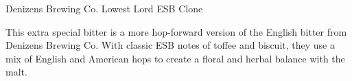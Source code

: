 \stylesection{\stylestrongbitter}

\begin{recipe}{Denizens Brewing Co. Lowest Lord ESB Clone}

\begin{aboutblock}
This extra special bitter is a more hop-forward version of the English bitter
from Denizens Brewing Co. With classic ESB notes of toffee and biscuit, they use
a mix of English and American hops to create a floral and herbal balance with
the malt. \sourceaha
\end{aboutblock}


\begin{methodandtiming}
 
\begin{mashsteps}
\end{mashsteps}

\end{methodandtiming}

\recipebreak

\begin{ingredientsblock}

\begin{malts}
\end{malts}

\begin{hops}
\end{hops}


\end{ingredientsblock}

\end{recipe}

